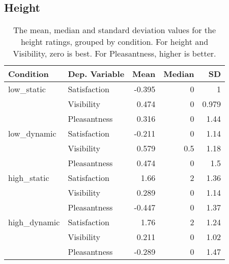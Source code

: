 \subsection{Height}
\begin{table}[ht]
    \centering
    \caption{The mean, median and standard deviation values for the height ratings, grouped by condition. For height and Visibility, zero is best. For Pleasantness, higher is better.}
    \begin{tabular}{llrrr}
    \toprule
    \textbf{Condition} & \textbf{Dep. Variable} & \textbf{Mean}            & \textbf{Median}       & \textbf{SD}              \\
    \midrule
    low\_static        & Satisfaction                & -0.395                   & 0                     & 1                        \\
                       & Visibility                  & 0.474                    & 0                     & 0.979                    \\
                       & Pleasantness                & 0.316                    & 0                     & 1.44                     \\
    low\_dynamic       & Satisfaction                & -0.211                   & 0                     & 1.14                     \\
                       & Visibility                  & 0.579                    & 0.5                   & 1.18                     \\
                       & Pleasantness                & 0.474                    & 0                     & 1.5                      \\
    high\_static       & Satisfaction                & 1.66                     & 2                     & 1.36                     \\
                       & Visibility                  & 0.289                    & 0                     & 1.14                     \\
                       & Pleasantness                & -0.447                   & 0                     & 1.37                     \\
    high\_dynamic      & Satisfaction                & 1.76                     & 2                     & 1.24                     \\
                       & Visibility                  & 0.211                    & 0                     & 1.02                     \\
                       & Pleasantness                & -0.289                   & 0                     & 1.47                     \\
    \bottomrule
    \end{tabular}
\end{table}

